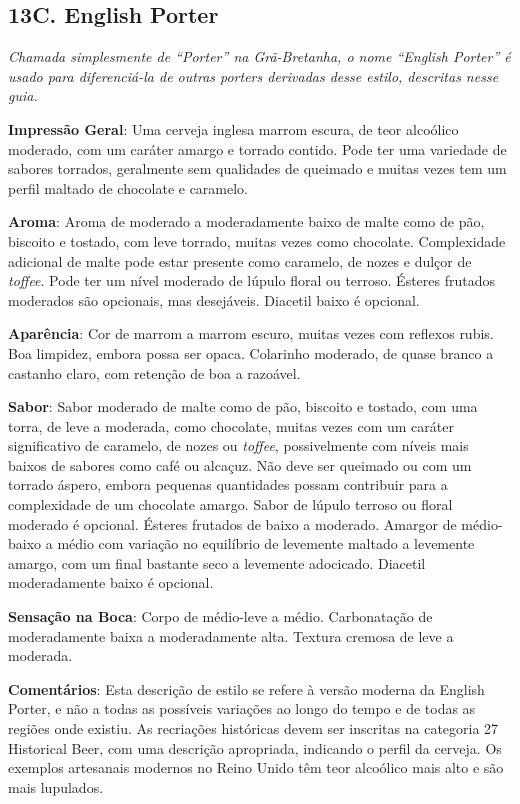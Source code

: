\subsection*{13C. English Porter}
\textit{Chamada simplesmente de “Porter” na Grã-Bretanha, o nome “English Porter” é usado para diferenciá-la de outras porters derivadas desse estilo, descritas nesse guia.}

\textbf{Impressão Geral}: Uma cerveja inglesa marrom escura, de teor alcoólico moderado, com um caráter amargo e torrado contido. Pode ter uma variedade de sabores torrados, geralmente sem qualidades de queimado e muitas vezes tem um perfil maltado de chocolate e caramelo.

\textbf{Aroma}: Aroma de moderado a moderadamente baixo de malte como de pão, biscoito e tostado, com leve torrado, muitas vezes como chocolate. Complexidade adicional de malte pode estar presente como caramelo, de nozes e dulçor de \textit{toffee}. Pode ter um nível moderado de lúpulo floral ou terroso. Ésteres frutados moderados são opcionais, mas desejáveis. Diacetil baixo é opcional.

\textbf{Aparência}: Cor de marrom a marrom escuro, muitas vezes com reflexos rubis. Boa limpidez, embora possa ser opaca. Colarinho moderado, de quase branco a castanho claro, com retenção de boa a razoável.

\textbf{Sabor}: Sabor moderado de malte como de pão, biscoito e tostado, com uma torra, de leve a moderada, como chocolate, muitas vezes com um caráter significativo de caramelo, de nozes ou \textit{toffee}, possivelmente com níveis mais baixos de sabores como café ou alcaçuz. Não deve ser queimado ou com um torrado áspero, embora pequenas quantidades possam contribuir para a complexidade de um chocolate amargo. Sabor de lúpulo terroso ou floral moderado é opcional. Ésteres frutados de baixo a moderado. Amargor de médio-baixo a médio com variação no equilíbrio de levemente maltado a levemente amargo, com um final bastante seco a levemente adocicado. Diacetil moderadamente baixo é opcional.

\textbf{Sensação na Boca}: Corpo de médio-leve a médio. Carbonatação de moderadamente baixa a moderadamente alta. Textura cremosa de leve a moderada.

\textbf{Comentários}: Esta descrição de estilo se refere à versão moderna da English Porter, e não a todas as possíveis variações ao longo do tempo e de todas as regiões onde existiu. As recriações históricas devem ser inscritas na categoria 27 Historical Beer, com uma descrição apropriada, indicando o perfil da cerveja. Os exemplos artesanais modernos no Reino Unido têm teor alcoólico mais alto e são mais lupulados.

